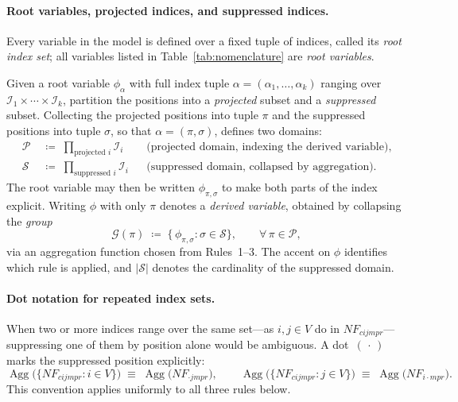 \begin{convention}
\label{conv:notation}

\paragraph{Root variables, projected indices, and suppressed indices.}
Every variable in the model is defined over a fixed tuple of indices, called
its \emph{root index set}; all variables listed in
Table~\ref{tab:nomenclature} are \emph{root variables}.

Given a root variable $\phi_{\alpha}$ with full index tuple
$\alpha = (\alpha_1, \dots, \alpha_k)$ ranging over
$\mathcal{I}_1 \times \cdots \times \mathcal{I}_k$, partition the positions
into a \emph{projected} subset and a \emph{suppressed} subset. Collecting
the projected positions into tuple $\pi$ and the suppressed positions into
tuple $\sigma$, so that $\alpha = (\pi, \sigma)$, defines two domains:
\begin{align*}
  \mathcal{P} &\;\coloneqq\;
    \prod_{\text{projected } i} \mathcal{I}_i
    & &\text{(projected domain, indexing the derived variable),}\\
  \mathcal{S} &\;\coloneqq\;
    \prod_{\text{suppressed } i} \mathcal{I}_i
    & &\text{(suppressed domain, collapsed by aggregation).}
\end{align*}
The root variable may then be written $\phi_{\pi,\sigma}$ to make both
parts of the index explicit. Writing $\phi$ with only $\pi$ denotes a
\emph{derived variable}, obtained by collapsing the \emph{group}
\[
  \mathcal{G}(\pi)
  \;\coloneqq\;
  \bigl\{\, \phi_{\pi,\sigma} : \sigma \in \mathcal{S} \bigr\},
  \qquad \forall\,\pi \in \mathcal{P},
\]
via an aggregation function chosen from Rules~1--3. The accent on $\phi$
identifies which rule is applied, and $|\mathcal{S}|$ denotes the
cardinality of the suppressed domain.

\paragraph{Dot notation for repeated index sets.}
When two or more indices range over the same set---as $i, j \in V$ do in
$NF_{cijmpr}$---suppressing one of them by position alone would be
ambiguous. A dot~$(\,\cdot\,)$ marks the suppressed position explicitly:
\[
  \operatorname{Agg}\!\bigl(\{NF_{cijmpr} : i \in V\}\bigr)
  \;\equiv\;
  \operatorname{Agg}\!\bigl(NF_{\cdot jmpr}\bigr),
  \qquad
  \operatorname{Agg}\!\bigl(\{NF_{cijmpr} : j \in V\}\bigr)
  \;\equiv\;
  \operatorname{Agg}\!\bigl(NF_{i\cdot mpr}\bigr).
\]
This convention applies uniformly to all three rules below.


\end{convention}
